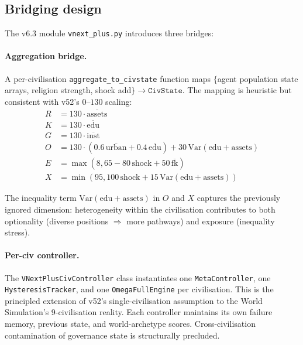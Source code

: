 \subsection{Bridging design}

The v6.3 module \texttt{vnext\_plus.py} introduces three bridges:

\paragraph{Aggregation bridge.}
A per-civilisation \texttt{aggregate\_to\_civstate} function maps
$\{$agent population state arrays, religion strength, shock add$\} \to
\texttt{CivState}$. The mapping is heuristic but consistent with v52's
$0$--$130$ scaling:
\begin{equation*}
\begin{aligned}
R &= 130 \cdot \overline{\text{assets}} \\
K &= 130 \cdot \overline{\text{edu}} \\
G &= 130 \cdot \overline{\text{inst}} \\
O &= 130 \cdot (0.6\,\overline{\text{urban}} + 0.4\,\overline{\text{edu}})
    + 30\,\mathrm{Var}(\text{edu}+\text{assets}) \\
E &= \max(8, 65 - 80\,\text{shock} + 50\,\overline{\text{fk}}) \\
X &= \min(95, 100\,\text{shock} + 15\,\mathrm{Var}(\text{edu}+\text{assets}))
\end{aligned}
\end{equation*}

The inequality term $\mathrm{Var}(\text{edu}+\text{assets})$ in $O$ and
$X$ captures the previously ignored dimension: heterogeneity within the
civilisation contributes to both optionality (diverse positions $\Rightarrow$
more pathways) and exposure (inequality stress).

\paragraph{Per-civ controller.}
The \texttt{VNextPlusCivController} class instantiates one
\texttt{MetaController}, one \texttt{HysteresisTracker}, and one
\texttt{OmegaFullEngine} per civilisation. This is the principled
extension of v52's single-civilisation assumption to the World Simulation's
9-civilisation reality. Each controller maintains its own failure memory,
previous state, and world-archetype scores. Cross-civilisation
contamination of governance state is structurally precluded.

